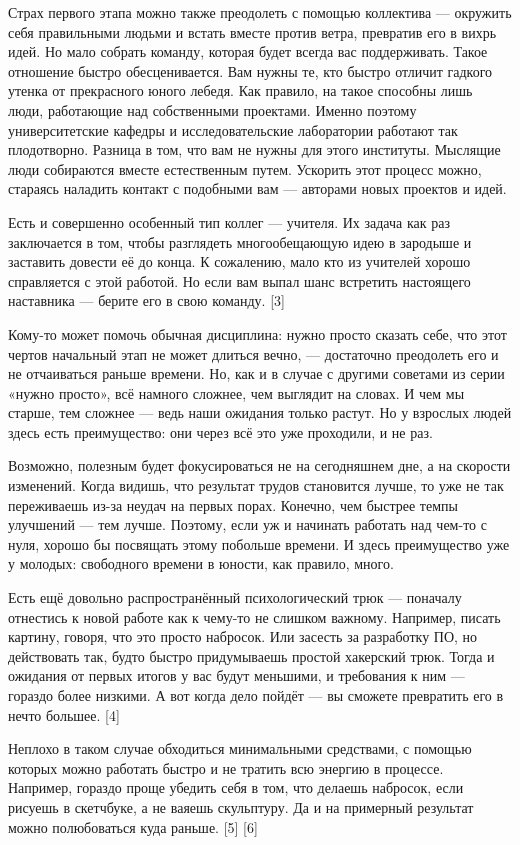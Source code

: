 \documentclass[ebook,12pt,oneside,openany]{memoir}
\begin{document}
Страх первого этапа можно также преодолеть с помощью коллектива —
окружить себя правильными людьми и встать вместе против ветра,
превратив его в вихрь идей. Но мало собрать команду, которая будет
всегда вас поддерживать. Такое отношение быстро обесценивается. Вам
нужны те, кто быстро отличит гадкого утенка от прекрасного юного
лебедя. Как правило, на такое способны лишь люди, работающие над
собственными проектами. Именно поэтому университетские кафедры и
исследовательские лаборатории работают так плодотворно. Разница в том,
что вам не нужны для этого институты. Мыслящие люди собираются вместе
естественным путем. Ускорить этот процесс можно, стараясь наладить
контакт с подобными вам — авторами новых проектов и идей.

Есть и совершенно особенный тип коллег — учителя. Их задача как раз
заключается в том, чтобы разглядеть многообещающую идею в зародыше и
заставить довести её до конца. К сожалению, мало кто из учителей
хорошо справляется с этой работой. Но если вам выпал шанс встретить
настоящего наставника — берите его в свою команду. [3]

Кому-то может помочь обычная дисциплина: нужно просто сказать себе,
что этот чертов начальный этап не может длиться вечно, — достаточно
преодолеть его и не отчаиваться раньше времени. Но, как и в случае с
другими советами из серии «нужно просто», всё намного сложнее, чем
выглядит на словах. И чем мы старше, тем сложнее — ведь наши ожидания
только растут. Но у взрослых людей здесь есть преимущество: они через
всё это уже проходили, и не раз.

Возможно, полезным будет фокусироваться не на сегодняшнем дне, а на
скорости изменений. Когда видишь, что результат трудов становится
лучше, то уже не так переживаешь из-за неудач на первых порах.
Конечно, чем быстрее темпы улучшений — тем лучше. Поэтому, если уж и
начинать работать над чем-то с нуля, хорошо бы посвящать этому
побольше времени. И здесь преимущество уже у молодых: свободного
времени в юности, как правило, много.

Есть ещё довольно распространённый психологический трюк — поначалу
отнестись к новой работе как к чему-то не слишком важному. Например,
писать картину, говоря, что это просто набросок. Или засесть за
разработку ПО, но действовать так, будто быстро придумываешь простой
хакерский трюк. Тогда и ожидания от первых итогов у вас будут
меньшими, и требования к ним — гораздо более низкими. А вот когда дело
пойдёт — вы сможете превратить его в нечто большее. [4]

Неплохо в таком случае обходиться минимальными средствами, с помощью
которых можно работать быстро и не тратить всю энергию в процессе.
Например, гораздо проще убедить себя в том, что делаешь набросок, если
рисуешь в скетчбуке, а не ваяешь скульптуру. Да и на примерный
результат можно полюбоваться куда раньше. [5] [6]
\end{document}
